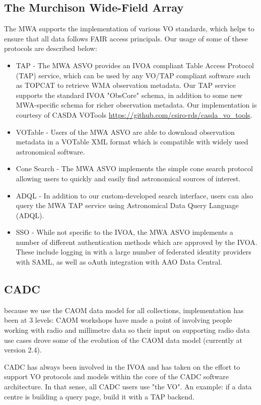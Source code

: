 \documentclass[11pt,a4paper]{ivoa}
\begin{document}
\subsection{The Murchison Wide-Field Array}
\label{sec:MWA}
The MWA supports the implementation of various VO standards, which helps to ensure that all data follows 
FAIR access principals. Our usage of some of these protocols are described below:
\begin{itemize}
\item TAP - The MWA ASVO provides an IVOA compliant Table Access Protocol (TAP) service, which can be 
used by any VO/TAP compliant software such as TOPCAT to retrieve WMA observation metadata. Our TAP 
service supports the standard IVOA "ObsCore" schema, in addition to some new MWA-specific schema for 
richer observation metadata. Our implementation is courtesy of CASDA VOTools 
\url{https://github.com/csiro-rds/casda_vo_tools}.
\item VOTable - Users of the MWA ASVO are able to download observation metadata in a VOTable XML format 
which is compatible with widely used astronomical software.
\item Cone Search - The MWA ASVO implements the simple cone search protocol allowing users to quickly
and easily find astronomical sources of interest.
\item ADQL - In addition to our custom-developed search interface, users can also query the MWA TAP
service using Astronomical Data Query Language (ADQL).
\item SSO - While not specific to the IVOA, the MWA ASVO implements a number of different authentication 
methods which are approved by the IVOA. These include logging in with a large number of federated 
identity providers with SAML, as well as oAuth integration with AAO Data Central.
\end{itemize}

\subsection{CADC}
\label{sec:CADC}
because we use the CAOM data model for all collections, implementation has been at 3 levels:
CAOM workshops have made a point of involving people working with radio and millimetre data so their 
input on supporting radio data use cases drove some of the evolution of the CAOM data model (currently 
at version 2.4).

CADC has always been involved in the IVOA and has taken on the effort to support VO protocols and models 
within the core of the CADC software architecture. In that sense, all CADC users use "the VO".  An 
example: if a data centre is building a query page, build it with a TAP backend.
\end{document}
